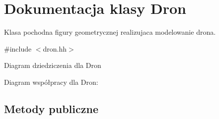 \hypertarget{class_dron}{}\section{Dokumentacja klasy Dron}
\label{class_dron}


Klasa pochodna figury geometrycznej realizujaca modelowanie drona.  




{\ttfamily \#include $<$dron.\+hh$>$}



Diagram dziedziczenia dla Dron


Diagram współpracy dla Dron\+:
\subsection*{Metody publiczne}
